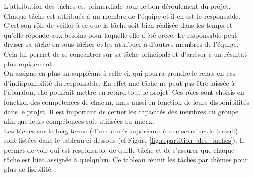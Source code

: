

L'attribution des tâches est primordiale pour le bon déroulement du projet.
Chaque tâche est attribuée à un membre de l'équipe et il en est le responsable.
C'est son rôle de veiller à ce que la tâche soit bien réalisée dans les temps et qu'elle réponde aux besoins pour laquelle elle a été créée.
Le responsable peut diviser sa tâche en sous-tâches et les attribuer à d'autres membres de l'équipe.
Cela lui permet de se concentrer sur sa tâche principale et d'arriver à un résultat plus rapidement.
\\

On assigne en plus un suppléant à celle-ci, qui pourra prendre le relais en cas d'indisponibilité du responsable.
En effet une tâche ne peut pas être laissée à l'abandon, elle pourrait mettre en retard tout le projet.
Ces rôles sont choisis en fonction des compétences de chacun, mais aussi en fonction de leurs disponibilités dans le projet.
Il est important de cerner les capacités des membres du groupe afin que leurs compétences soit utilisées au mieux.
\\

Les tâches sur le long terme (d'une durée supérieure à une semaine de travail)
sont listées dans le tableau ci-dessous (cf Figure \ref*{fig:repartition_des_taches}).
Il permet de voir qui est responsable de quelle tâche et de s'assurer que chaque tâche est bien assign\'ee à quelqu'un.
Ce tableau réunit les tâches par thèmes pour plus de lisibilité.


